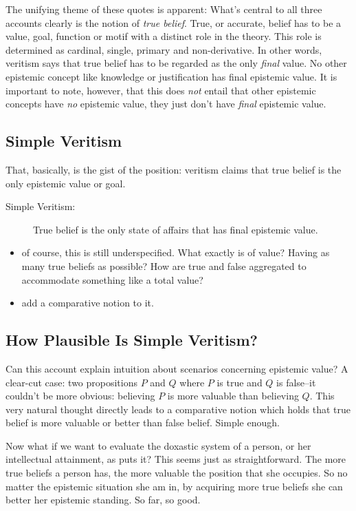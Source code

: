 \documentclass[12pt,numbers=noenddot]{scrartcl}
\begin{document}
The unifying theme of these quotes is apparent: What’s central to all three accounts clearly is the notion of \emph{true belief}. True, or accurate, belief has to be a value, goal, function or motif with a distinct role in the theory. This role is determined as cardinal, single, primary and non-derivative. In other words, veritism says that true belief has to be regarded as the only \emph{final} value. No other epistemic concept like knowledge or justification has final epistemic value. It is important to note, however, that this does \emph{not} entail that other epistemic concepts have \emph{no} epistemic value, they just don’t have \emph{final} epistemic value.

\subsection{Simple Veritism}
That, basically, is the gist of the position: veritism claims that true belief is the only epistemic value or goal. 

\begin{description}
    \item[Simple Veritism:] True belief is the only state of affairs that has final epistemic value.
\end{description}

\begin{itemize}
    \item of course, this is still underspecified. What exactly is of value? Having as many true beliefs as possible? How are true and false aggregated to accommodate something like a total value?
    \item add a comparative notion to it.
\end{itemize}

\subsection{How Plausible Is Simple Veritism?}

Can this account explain intuition about scenarios concerning epistemic value?  A clear-cut case: two propositions $P$ and $Q$ where $P$ is true and $Q$ is false–it couldn't be more obvious: believing $P$ is more valuable than believing $Q$. This very natural thought directly leads to a comparative notion which holds that true belief is more valuable or better than false belief. Simple enough.

Now what if we want to evaluate the doxastic system of a person, or her intellectual attainment, as \textcite[12]{Goldman2002-GOLTUO-2} puts it? This seems just as straightforward. The more true beliefs a person has, the more valuable the position that she occupies. So no matter the epistemic situation she am in, by acquiring more true beliefs she can better her epistemic standing. So far, so good.
\end{document}
